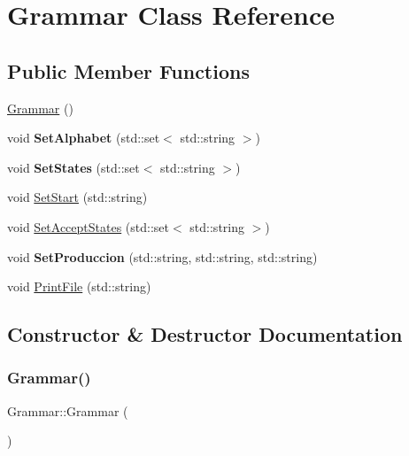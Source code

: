 \hypertarget{classGrammar}{}\section{Grammar Class Reference}
\label{classGrammar}
\subsection*{Public Member Functions}
\begin{DoxyCompactItemize}
\item 
\hyperlink{classGrammar_aa201250a002a7d07d398fee189a74427}{Grammar} ()
\item 
\mbox{\label{classGrammar_ac0e288917edf6689b09ba7066ec24b96}} 
void {\bfseries Set\+Alphabet} (std\+::set$<$ std\+::string $>$)
\item 
\mbox{\label{classGrammar_ae9e0c4be302e137bc2587c487d7c4b6a}} 
void {\bfseries Set\+States} (std\+::set$<$ std\+::string $>$)
\item 
void \hyperlink{classGrammar_a8729a9cee27c29079970a78163c8ed0f}{Set\+Start} (std\+::string)
\item 
void \hyperlink{classGrammar_a182676fa0ce7f6ce737a2fd4c357b3e2}{Set\+Accept\+States} (std\+::set$<$ std\+::string $>$)
\item 
\mbox{\label{classGrammar_a6bba075a6a8c00f3cd5182deb15e9290}} 
void {\bfseries Set\+Produccion} (std\+::string, std\+::string, std\+::string)
\item 
void \hyperlink{classGrammar_a4bb28fac57fe1177d5e95e833d3717d1}{Print\+File} (std\+::string)
\end{DoxyCompactItemize}


\subsection{Constructor \& Destructor Documentation}
\mbox{\label{classGrammar_aa201250a002a7d07d398fee189a74427}} 
\subsubsection{\texorpdfstring{Grammar()}{Grammar()}}
{\footnotesize\ttfamily Grammar\+::\+Grammar (\begin{DoxyParamCaption}{ }\end{DoxyParamCaption})}

